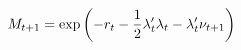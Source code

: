 \begin{equation} \label{eq:SDF}
	M_{t+1} = \exp\left( -r_{t} -\frac{1}{2} \lambda_{t}'\lambda_{t} - \lambda_{t}'\nu_{t+1} \right)
\end{equation}